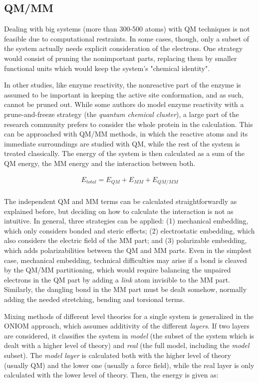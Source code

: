 \subsection{QM/MM}
\label{section:qmmm}

Dealing with big systems (more than 300-500 atoms) with QM techniques is not feasible due to computational restraints. In some cases, though, only a subset of the system actually needs explicit consideration of the electrons. One strategy would consist of pruning the nonimportant parts, replacing them by smaller functional units which would keep the system’s "chemical identity".

In other studies, like enzyme reactivity, the nonreactive part of the enzyme is assumed to be important in keeping the active site conformation, and as such, cannot be pruned out. While some authors do model enzyme reactivity with a prune-and-freeze strategy (the \textit{quantum chemical cluster}\cite{siegbahn2009recent}), a large part of the research community prefers to consider the whole protein in the calculation. This can be approached with QM/MM methods, in which the reactive atoms and its immediate surroundings are studied with QM, while the rest of the system is treated classically. The energy of the system is then calculated as a sum of the QM energy, the MM energy and the interaction between both.


\begin{align}
	E_{total}=E_{QM}+E_{MM}+E_{QM/MM} \\ \tag{QM/MM energy}
\end{align}


The independent QM and MM terms can be calculated straightforwardly as explained before, but deciding on how to calculate the interaction is not as intuitive. In general, three strategies can be applied: (1) mechanical embedding, which only considers bonded and steric effects; (2) electrostatic embedding, which also considers the electric field of the MM part; and (3) polarizable embedding, which adds polarizabilities between the QM and MM parts. Even in the simplest case, mechanical embedding, technical difficulties may arise if a bond is cleaved by the QM/MM partitioning, which would require balancing the unpaired electrons in the QM part by adding a \textit{link} atom invisible to the MM part. Similarly, the dangling bond in the MM part must be dealt somehow, normally adding the needed stretching, bending and torsional terms.

Mixing methods of different level theories for a single system is generalized in the ONIOM approach, which assumes additivity of the different \textit{layers}. If two layers are considered, it classifies the system in \textit{model} (the subset of the system which is dealt with a higher level of theory) and \textit{real} (the full model, including the \textit{model} subset). The \textit{model layer} is calculated both with the higher level of theory (usually QM) and the lower one (usually a force field), while the real layer is only calculated with the lower level of theory. Then, the energy is given as:

